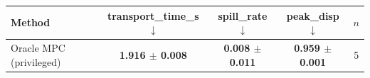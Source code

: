 \begin{tabular}{lcccc}
\toprule
Method & transport\_time\_s $\downarrow$ & spill\_rate $\downarrow$ & peak\_disp $\downarrow$ & $n$ \\
\midrule
Oracle MPC (privileged) & \textbf{1.916 $\pm$ 0.008} & \textbf{0.008 $\pm$ 0.011} & \textbf{0.959 $\pm$ 0.001} & 5 \\
\bottomrule
\end{tabular}
